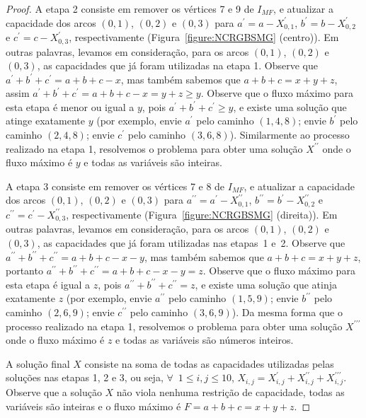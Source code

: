 \begin{proof}
A etapa 2 consiste em remover os vértices 7 e 9 de $I_{MF}$, e atualizar a capacidade dos arcos $(0,1)$, $(0,2)$ e $(0,3)$ para $a ^{\prime}=a-X^{\prime}_{0,1}$, $b^{\prime}=b-X^{\prime}_{0,2}$ e $c^{\prime} =c-X^{\prime}_{0,3}$, respectivamente (Figura~\ref{figure:NCRGBSMG} (centro)). Em outras palavras, levamos em consideração, para os arcos $(0,1)$, $(0,2)$ e $(0,3)$, as capacidades que já foram utilizadas na etapa 1. Observe que $a^{\prime}+b^{\prime}+c^{\prime} = a+b+c-x$, mas também sabemos que $a+b+c = x+y+z$, assim $a^{\prime}+b^{\prime}+c^{\prime} = a+b+c-x = y+z \geq y$. Observe que o fluxo máximo para esta etapa é menor ou igual a $y$, pois $a^{\prime}+b^{\prime}+c^{\prime} \ge y$, e existe uma solução que atinge exatamente $y$ (por exemplo, envie $a^{\prime}$ pelo caminho $(1,4,8)$; envie $b^{\prime}$ pelo caminho $(2,4,8) $; envie $c^{\prime}$ pelo caminho $(3,6,8)$). Similarmente ao processo realizado na etapa 1, resolvemos o problema para obter uma solução $X^{\prime\prime}$ onde o fluxo máximo é $y$ e todas as variáveis são inteiras.

A etapa 3 consiste em remover os vértices 7 e 8 de $I_{MF}$, e atualizar a capacidade dos arcos $(0,1)$, $(0,2)$ e $(0,3)$ para $a ^{\prime\prime}=a^{\prime}-X^{\prime\prime}_{0,1}$, $b^{\prime\prime}=b^{\prime}-X^ {\prime\prime}_{0,2}$ e $c^{\prime\prime}=c^{\prime}-X^{\prime\prime}_{0,3}$, respectivamente (Figura~\ref{figure:NCRGBSMG} (direita)). Em outras palavras, levamos em consideração, para os arcos $(0,1)$, $(0,2)$ e $(0,3)$, as capacidades que já foram utilizadas nas etapas~1 e~2. Observe que $a^{\prime\prime}+b^{\prime\prime}+c^{\prime\prime} = a+b+c-x-y$, mas também sabemos que $a+b+c = x +y+z$, portanto $a^{\prime\prime}+b^{\prime\prime}+c^{\prime\prime} = a+b+c-x-y = z$. Observe que o fluxo máximo para esta etapa é igual a $z$, pois $a^{\prime\prime}+b^{\prime\prime}+c^{\prime\prime} = z$, e existe uma solução que atinja exatamente $z$ (por exemplo, envie $a^{\prime\prime}$ pelo caminho $(1,5,9)$; envie $b^{\prime\prime}$ pelo caminho $ (2,6,9)$; envie $c^{\prime\prime}$ pelo caminho $(3,6,9)$). Da mesma forma que o processo realizado na etapa 1, resolvemos o problema para obter uma solução $X^{\prime\prime\prime}$ onde o fluxo máximo é $z$ e todas as variáveis são números inteiros.



A solução final $X$ consiste na soma de todas as capacidades utilizadas pelas soluções nas etapas 1, 2 e 3, ou seja, $\forall$~$1\leq i,j\leq 10$, $X_{i, j} = X^{\prime}_{i,j} + X^{\prime\prime}_{i,j} + X^{\prime\prime\prime}_{i,j}$. Observe que a solução $X$ não viola nenhuma restrição de capacidade, todas as variáveis são inteiras e o fluxo máximo é $F=a+b+c=x+y+z$.

\end{proof}

